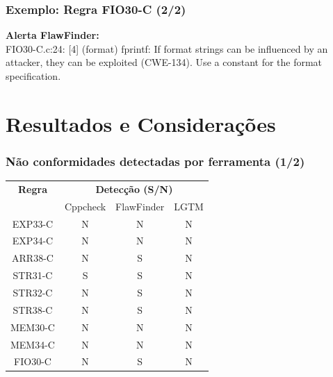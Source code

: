 \documentclass{beamer}
\begin{document}
\begin{frame}
  \frametitle{Exemplo: Regra FIO30-C (2/2)}
  \textbf{\Large Alerta FlawFinder:}\\\medskip
  FIO30-C.c:24: [4] (format) fprintf:
  If format strings can be influenced by an attacker, they can be exploited (CWE-134). Use a constant for the format specification.
\end{frame}

\section{Resultados e Considerações}

\begin{frame}
  \frametitle{Não conformidades detectadas por ferramenta (1/2)}
  \begin{table}[]
    \begin{tabular}{@{}cccc@{}}
    \toprule
    \textbf{Regra} & \multicolumn{3}{c}{\textbf{Detecção (S/N)}} \\
                   & Cppcheck & FlawFinder & LGTM \\ \midrule
    EXP33-C        & N        & N          & N    \\ \midrule
    EXP34-C        & N        & N          & N    \\ \midrule
    ARR38-C        & N        & S          & N    \\ \midrule
    STR31-C        & S        & S          & N    \\ \midrule
    STR32-C        & N        & S          & N    \\ \midrule
    STR38-C        & N        & S          & N    \\ \midrule
    MEM30-C        & N        & N          & N    \\ \midrule
    MEM34-C        & N        & N          & N    \\ \midrule
    FIO30-C        & N        & S          & N    \\ \bottomrule
    \end{tabular}
    \end{table}

\end{frame}
\end{document}

